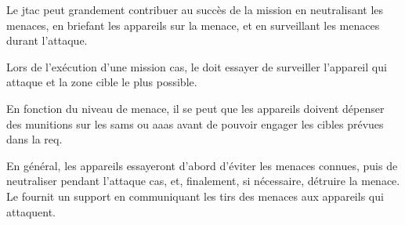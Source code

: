 \begin{e1}
\begin{e2}
{			Le \gls{jtac} peut grandement contribuer au succès de la mission en neutralisant les menaces, en briefant les appareils sur la menace, et en surveillant les menaces durant l'attaque.
			
			Lors de l'exécution d'une mission \gls{cas}, le \ja{} doit essayer de surveiller l'appareil qui attaque et la zone cible le plus possible.
			
			En fonction du niveau de menace, il se peut que les appareils doivent dépenser des munitions sur les \glspl{sam} ou \glspl{aaa} avant de pouvoir engager les cibles prévues dans la \gls{req}.
			
			En général, les appareils essayeront d'abord d'éviter les menaces connues, puis de neutraliser pendant l'attaque \gls{cas}, et, finalement, si nécessaire, détruire la menace. Le \ja{} fournit un support en communiquant les tirs des menaces aux appareils qui attaquent.
		}
		
		
	\end{e2}
\end{e1}

